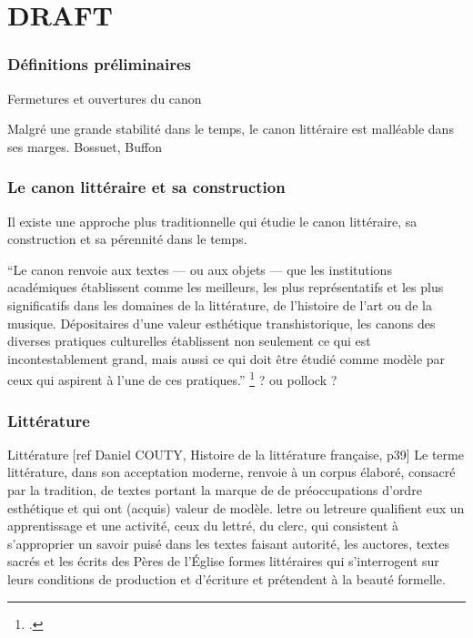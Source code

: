 
\part{DRAFT}

\section{Définitions préliminaires}

Fermetures et ouvertures du canon

Malgré une grande stabilité dans le temps, le canon littéraire est malléable dans ses marges. Bossuet, Buffon


\section{Le canon littéraire et sa construction}

Il existe une approche plus traditionnelle qui étudie le canon littéraire, sa construction et sa pérennité dans le temps. 


\enquote{Le canon renvoie aux textes — ou aux objets — que les institutions académiques établissent comme les meilleurs, les plus représentatifs et les plus significatifs dans les domaines de la littérature, de l’histoire de l’art ou de la musique. Dépositaires d’une valeur esthétique transhistorique, les canons des diverses pratiques culturelles établissent non seulement ce qui est incontestablement grand, mais aussi ce qui doit être étudié comme modèle par ceux qui aspirent à l’une de ces pratiques.}
\footcites{harder_deconstruire_2013} ? ou pollock ?


\section{Littérature}

Littérature
[ref Daniel COUTY, Histoire de la littérature française, p39]
Le terme littérature, dans son acceptation moderne, renvoie à un corpus élaboré, consacré par la tradition, de textes portant la marque de de préoccupations d'ordre esthétique et qui ont (acquis) valeur de modèle. letre ou letreure qualifient eux un apprentissage et une activité, ceux du lettré, du clerc, qui consistent à s'approprier un savoir puisé dans les textes faisant autorité, les auctores, textes sacrés et les écrits des Pères de l'Église
formes littéraires qui s'interrogent sur leurs conditions de production et d'écriture et prétendent à la beauté formelle. 

